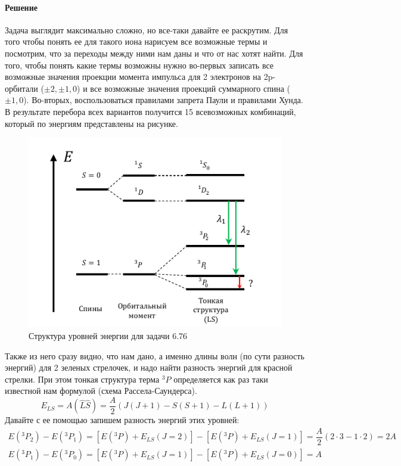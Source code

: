 \documentclass[12pt]{article}
\begin{document}
\paragraph{Решение}
Задача выглядит максимально сложно, но все-таки давайте ее раскрутим. Для того чтобы понять ее для такого иона нарисуем все возможные термы и посмотрим, что за переходы между ними нам даны и что от нас хотят найти. Для того, чтобы понять какие термы возможны нужно во-первых записать все возможные значения проекции момента импульса для 2 электронов на 2p-орбитали ($\pm 2, \pm 1, 0$) и все возможные значения проекций суммарного спина ($\pm 1, 0$). Во-вторых, воспользоваться правилами запрета Паули и правилами Хунда. В результате перебора всех вариантов получится 15 всевозможных комбинаций, который по энергиям представлены на рисунке. 
\begin{figure}[h]
    \centering
    \includegraphics[width=\textwidth,height=\textheight,keepaspectratio]{Seminar_07/pics/pic_04.pdf}
    \caption{Структура уровней энергии для задачи 6.76}
    \label{fig:sem_04}
\end{figure}
Также из него сразу видно, что нам дано,  а именно длины волн (по сути разность энергий) для 2 зеленых стрелочек, и надо найти разность энергий для красной стрелки. При этом тонкая структура терма $^3P$ определяется как раз таки известной нам формулой (схема Рассела-Саундерса).
\begin{equation*}
    E_{LS} = A(\hat{L}\hat{S} ) = \dfrac{A}{2}\left(J(J+1) - S(S+1) -L(L+1) \right)
\end{equation*}
Давайте с ее помощью запишем разность энергий этих уровней:
\begin{gather*}
    E(^3P_2) - E(^3P_1) = [E(^3P)+E_{LS}(J=2)] - [E(^3P)+E_{LS}(J=1)] = \dfrac{A}{2}(2\cdot 3 - 1\cdot2)= 2A\\
    E(^3P_1) - E(^3P_0) = [E(^3P)+E_{LS}(J=1)] - [E(^3P)+E_{LS}(J=0)] = A\\
\end{gather*}
\end{document}
